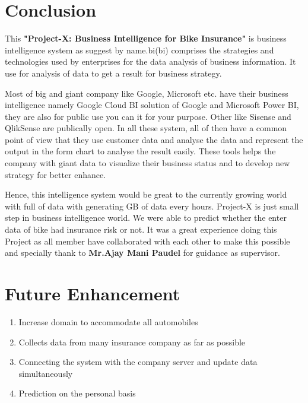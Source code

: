 \section{Conclusion}
\par
This \textbf{"Project-X: Business Intelligence for Bike Insurance"} is business intelligence system as suggest by name.\acl{bi}(\acs{bi}) comprises the strategies and technologies used by enterprises for the data analysis of business information. It use for analysis of data to get a result for business strategy.
\par Most of big and giant company like Google, Microsoft etc. have their business intelligence namely Google Cloud BI solution of Google and Microsoft Power BI, they are also for public use you can it for your purpose. Other like Sisense and QlikSense are publically open. In all these system, all of then have a common point of view that they use customer data and analyse the data and represent the output in the form chart to analyse the result easily. These tools helps the company with giant data to visualize their business status and to develop new strategy for better enhance.
\par 
Hence, this intelligence system would be great to the currently growing world with full of data with generating GB of data every hours. Project-X is just small step in  business intelligence world. We were able to predict whether the enter data of bike had insurance risk or not. It was a great experience doing this Project as all member have collaborated with each other to make this possible and specially thank to \textbf{Mr.Ajay Mani Paudel} for guidance as supervisor.

 \newpage
\section{Future Enhancement}
\begin{enumerate}
\item Increase domain to accommodate  all automobiles 
\item Collects data from many insurance company as far as possible
\item Connecting the system with the company server and update data simultaneously
\item Prediction on  the personal basis
\end{enumerate}

\renewcommand\bibname{References} %




